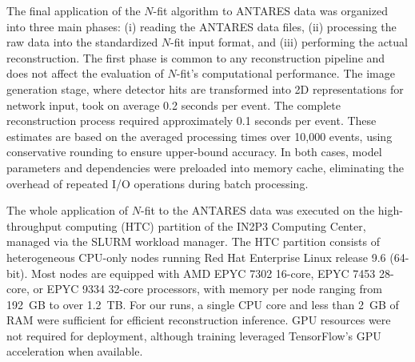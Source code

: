 
The final application of the $N$-fit algorithm to ANTARES data was organized into three main phases: (i) reading the ANTARES data files, (ii) processing the raw data into the standardized $N$-fit input format, and (iii) performing the actual reconstruction. The first phase is common to any reconstruction pipeline and does not affect the evaluation of $N$-fit's computational performance. The image generation stage, where detector hits are transformed into 2D representations for network input, took on average 0.2 seconds per event. The complete reconstruction process required approximately 0.1 seconds per event. These estimates are based on the averaged processing times over 10,000 events, using conservative rounding to ensure upper-bound accuracy. In both cases, model parameters and dependencies were preloaded into memory cache, eliminating the overhead of repeated I/O operations during batch processing.

The whole application of $N$-fit to the ANTARES data was executed on the high-throughput computing (HTC) partition of the IN2P3 Computing Center, managed via the SLURM workload manager. The HTC partition consists of heterogeneous CPU-only nodes running Red Hat Enterprise Linux release 9.6 (64-bit). Most nodes are equipped with AMD EPYC 7302 16-core, EPYC 7453 28-core, or EPYC 9334 32-core processors, with memory per node ranging from 192~GB to over 1.2~TB. For our runs, a single CPU core and less than 2~GB of RAM were sufficient for efficient reconstruction inference. GPU resources were not required for deployment, although training leveraged TensorFlow's GPU acceleration when available.


